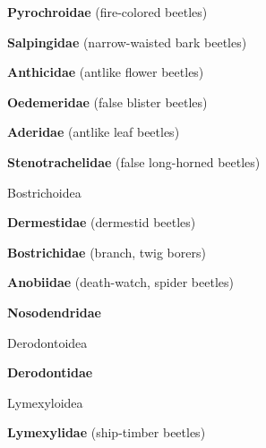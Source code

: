 \documentclass[letterpaper,10pt]{article}
\begin{document}
{\makebox[0.6cm]{}  \textbf{Pyrochroidae} (fire-colored beetles) \par
\makebox[0.6cm]{}  \textbf{Salpingidae} (narrow-waisted bark beetles) \par
\makebox[0.6cm]{}  \textbf{Anthicidae} (antlike flower beetles) \par
\makebox[0.6cm]{}  \textbf{Oedemeridae} (false blister beetles) \par
\makebox[0.6cm]{}  \textbf{Aderidae} (antlike leaf beetles) \par
\makebox[0.6cm]{}  \textbf{Stenotrachelidae} (false long-horned beetles) \par
\makebox[0.40cm]{}  Bostrichoidea \par
\makebox[0.6cm]{}  \textbf{Dermestidae} (dermestid beetles) \par
\makebox[0.6cm]{}  \textbf{Bostrichidae} (branch, twig borers) \par
\makebox[0.6cm]{}  \textbf{Anobiidae} (death-watch, spider beetles) \par
\makebox[0.6cm]{}  \textbf{Nosodendridae} \par
\makebox[0.40cm]{}  Derodontoidea \par
\makebox[0.6cm]{}  \textbf{Derodontidae} \par
\makebox[0.40cm]{}  Lymexyloidea \par
\makebox[0.6cm]{}  \textbf{Lymexylidae} (ship-timber beetles) \par
}
\end{document}
